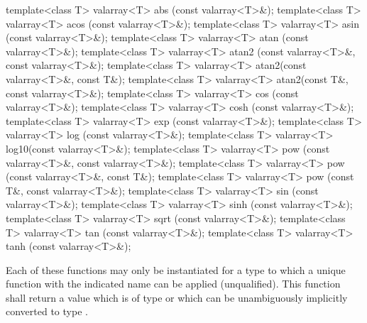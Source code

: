 %
%
%
%
%
%
%
%
%
%
%
%
%
%
%
%
\begin{itemdecl}
template<class T> valarray<T> abs  (const valarray<T>&);
template<class T> valarray<T> acos (const valarray<T>&);
template<class T> valarray<T> asin (const valarray<T>&);
template<class T> valarray<T> atan (const valarray<T>&);
template<class T> valarray<T> atan2
    (const valarray<T>&, const valarray<T>&);
template<class T> valarray<T> atan2(const valarray<T>&, const T&);
template<class T> valarray<T> atan2(const T&, const valarray<T>&);
template<class T> valarray<T> cos  (const valarray<T>&);
template<class T> valarray<T> cosh (const valarray<T>&);
template<class T> valarray<T> exp  (const valarray<T>&);
template<class T> valarray<T> log  (const valarray<T>&);
template<class T> valarray<T> log10(const valarray<T>&);
template<class T> valarray<T> pow
    (const valarray<T>&, const valarray<T>&);
template<class T> valarray<T> pow  (const valarray<T>&, const T&);
template<class T> valarray<T> pow  (const T&, const valarray<T>&);
template<class T> valarray<T> sin  (const valarray<T>&);
template<class T> valarray<T> sinh (const valarray<T>&);
template<class T> valarray<T> sqrt (const valarray<T>&);
template<class T> valarray<T> tan  (const valarray<T>&);
template<class T> valarray<T> tanh (const valarray<T>&);
\end{itemdecl}

\begin{itemdescr}
\pnum
\requires
Each of these functions may only be instantiated for a type 
to which a unique function with the indicated name can be applied (unqualified).
This function shall return a value which is of type 
or which can be unambiguously implicitly converted to type .
\end{itemdescr}

